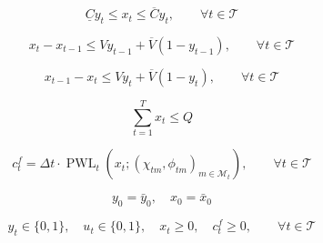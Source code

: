 \documentclass{article}
\begin{document}
\begin{equation}
\underline{C} y_t \le x_t \le \overline{C} y_t,
\qquad \forall t \in \mathcal{T}
\tag{1e}
\end{equation}

\begin{equation}
x_t - x_{t-1} \le V y_{t-1} + \overline{V}(1-y_{t-1}),
\qquad \forall t \in \mathcal{T}
\tag{1f}
\end{equation}

\begin{equation}
x_{t-1} - x_t \le V y_t + \overline{V}(1-y_t),
\qquad \forall t \in \mathcal{T}
\tag{1g}
\end{equation}

\begin{equation}
\sum_{t=1}^T x_t \le Q
\tag{1h}
\end{equation}

\begin{equation}
c_t^f = \Delta t \cdot \operatorname{PWL}_t(x_t;(\chi_{tm},\phi_{tm})_{m\in\mathcal{M}_t}),
\qquad
\forall t \in \mathcal{T}
\tag{1i}
\end{equation}

\begin{equation}
y_0 = \bar{y}_0,\quad x_0 = \bar{x}_0
\tag{1j}
\end{equation}

\begin{equation}
y_t \in \{0,1\},\quad
u_t \in \{0,1\},\quad
x_t \ge 0,\quad
c_t^f \ge 0,
\qquad \forall t \in \mathcal{T}
\tag{1k}
\end{equation}
\end{document}
